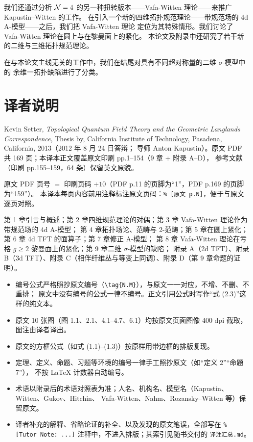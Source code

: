 我们还通过分析 $\mathcal{N}=4$ 的另一种扭转版本——Vafa-Witten 理论——来推广 Kapustin--Witten 的工作。
在引入一个新的四维拓扑规范理论——带规范场的 4d A-模型——之后，我们把 Vafa-Witten 理论
定位为其特殊情形。我们讨论了 Vafa-Witten 理论在圆上与在黎曼面上的紧化。
本论文及附录中还研究了若干新的二维与三维拓扑规范理论。

在与本论文主线无关的工作中，我们在结尾对具有不同超对称量的二维 $\sigma$-模型中的
余维一拓扑缺陷进行了分类。


\chapter*{译者说明}

Kevin Setter, \emph{Topological Quantum Field Theory and the Geometric Langlands Correspondence},
Thesis by, California Institute of Technology, Pasadena, California, 2013（2012 年 8 月 24 日答辩；
导师 Anton Kapustin）。原文 PDF 共 169 页；本译本正文覆盖原文印刷 pp.1--154（9 章 + 附录 A--D），
参考文献（印刷 pp.155--159，64 条）保留英文原貌。

原文 PDF 页号 $=$ 印刷页码 $+ 10$（PDF p.11 的页脚为“1”，PDF p.169 的页脚为“159”）。
本译本每页内容前用注释标注原文页码：\verb|% [原文 p.N]|，便于与原文逐页对照。

第 1 章引言与概述；第 2 章四维规范理论的对偶；第 3 章 Vafa-Witten 理论作为带规范场的 4d A-模型；
第 4 章拓扑场论、范畴与 2-范畴；第 5 章在圆上紧化；第 6 章 4d TFT 的面算子；第 7 章修正 A-模型；
第 8 章 Vafa-Witten 理论在亏格 $g\ge 2$ 黎曼面上的紧化；第 9 章二维 $\sigma$-模型的缺陷；
附录 A（2d TFT）、附录 B（3d TFT）、附录 C（相伴纤维丛与等变上同调）、附录 D（第 9 章命题的证明）。

\begin{itemize}[leftmargin=1.6em,itemsep=1pt,topsep=2pt]
\item 编号公式严格照抄原文编号（\verb|\tag{N.M}|），与原文一一对应，不增、不删、不重排；
      原文中没有编号的公式一律不编号。正文引用公式时写作“式 (2.3)”这样的纯文本。
\item 原文 10 张图（图 1.1、2.1、4.1--4.7、6.1）均按原文页面图像 400 dpi 截取，图注由译者译出。
\item 原文的方框公式（如式 (1.1)--(1.3)）按原样用带边框的排版复现。
\item 定理、定义、命题、习题等环境的编号一律手工照抄原文（如“定义 2”“命题 7”），
      不按 LaTeX 计数器自动编号。
\item 术语以附录后的术语对照表为准；人名、机构名、模型名（Kapustin、Witten、Gukov、Hitchin、
      Vafa-Witten、Nahm、Rozansky--Witten 等）保留原文。
\item 译者补充的解释、省略论证的补全、以及发现的原文笔误，全部写在
      \verb|% [Tutor Note: ...]| 注释中，不进入排版；其索引见随书交付的 \texttt{译注汇总.md}。
\end{itemize}

